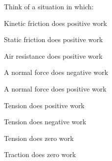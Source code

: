 \documentclass[12pt]{article}
\begin{document}
\Large
\centerline{}

\normalsize
\centerline{}



Think of a situation in which:

\vspace{0.3in}


\begin{minipage}{0.33\textwidth}	
	\begin{center}
		Kinetic friction does positive work 
	\end{center}
\end{minipage}
\begin{minipage}{0.33\textwidth}	
		\begin{center}
	Static friction does positive work
		\end{center}
\end{minipage}
\begin{minipage}{0.33\textwidth}	
		\begin{center}
	Air resistance does positive work
		\end{center}
\end{minipage}

\vspace{1in}

\begin{minipage}{0.33\textwidth}	
		\begin{center}
	A normal force does negative work
		\end{center}
\end{minipage}
\begin{minipage}{0.33\textwidth}	
		\begin{center}
	A normal force does positive work
		\end{center}
\end{minipage}
\begin{minipage}{0.33\textwidth}	
		\begin{center}
	Tension does positive work
		\end{center}
\end{minipage}

\vspace{1in}

\begin{minipage}{0.33\textwidth}	
		\begin{center}
	Tension does negative work
		\end{center}
\end{minipage}
\begin{minipage}{0.33\textwidth}	
		\begin{center}
	Tension does zero work
		\end{center}
\end{minipage}
\begin{minipage}{0.33\textwidth}	
		\begin{center}
	Traction does zero work
		\end{center}
\end{minipage}
\end{document}
